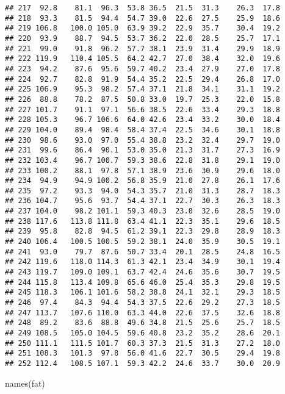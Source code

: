 \documentclass[
]{book}
\newenvironment{Shaded}{\begin{snugshade}}{\end{snugshade}}
\newcommand{\FunctionTok}[1]{\textcolor[rgb]{0.00,0.00,0.00}{#1}}
\newcommand{\NormalTok}[1]{#1}
\theoremstyle{definition}
\theoremstyle{definition}
\theoremstyle{definition}
\theoremstyle{definition}
\theoremstyle{remark}
\begin{document}
\begin{verbatim}
## 217  92.8    81.1  96.3  53.8 36.5  21.5  31.3    26.3  17.8
## 218  93.3    81.5  94.4  54.7 39.0  22.6  27.5    25.9  18.6
## 219 106.8   100.0 105.0  63.9 39.2  22.9  35.7    30.4  19.2
## 220  93.9    88.7  94.5  53.7 36.2  22.0  28.5    25.7  17.1
## 221  99.0    91.8  96.2  57.7 38.1  23.9  31.4    29.9  18.9
## 222 119.9   110.4 105.5  64.2 42.7  27.0  38.4    32.0  19.6
## 223  94.2    87.6  95.6  59.7 40.2  23.4  27.9    27.0  17.8
## 224  92.7    82.8  91.9  54.4 35.2  22.5  29.4    26.8  17.0
## 225 106.9    95.3  98.2  57.4 37.1  21.8  34.1    31.1  19.2
## 226  88.8    78.2  87.5  50.8 33.0  19.7  25.3    22.0  15.8
## 227 101.7    91.1  97.1  56.6 38.5  22.6  33.4    29.3  18.8
## 228 105.3    96.7 106.6  64.0 42.6  23.4  33.2    30.0  18.4
## 229 104.0    89.4  98.4  58.4 37.4  22.5  34.6    30.1  18.8
## 230  98.6    93.0  97.0  55.4 38.8  23.2  32.4    29.7  19.0
## 231  99.6    86.4  90.1  53.0 35.0  21.3  31.7    27.3  16.9
## 232 103.4    96.7 100.7  59.3 38.6  22.8  31.8    29.1  19.0
## 233 100.2    88.1  97.8  57.1 38.9  23.6  30.9    29.6  18.0
## 234  94.9    94.9 100.2  56.8 35.9  21.0  27.8    26.1  17.6
## 235  97.2    93.3  94.0  54.3 35.7  21.0  31.3    28.7  18.3
## 236 104.7    95.6  93.7  54.4 37.1  22.7  30.3    26.3  18.3
## 237 104.0    98.2 101.1  59.3 40.3  23.0  32.6    28.5  19.0
## 238 117.6   113.8 111.8  63.4 41.1  22.3  35.1    29.6  18.5
## 239  95.8    82.8  94.5  61.2 39.1  22.3  29.8    28.9  18.3
## 240 106.4   100.5 100.5  59.2 38.1  24.0  35.9    30.5  19.1
## 241  93.0    79.7  87.6  50.7 33.4  20.1  28.5    24.8  16.5
## 242 119.6   118.0 114.3  61.3 42.1  23.4  34.9    30.1  19.4
## 243 119.7   109.0 109.1  63.7 42.4  24.6  35.6    30.7  19.5
## 244 115.8   113.4 109.8  65.6 46.0  25.4  35.3    29.8  19.5
## 245 118.3   106.1 101.6  58.2 38.8  24.1  32.1    29.3  18.5
## 246  97.4    84.3  94.4  54.3 37.5  22.6  29.2    27.3  18.5
## 247 113.7   107.6 110.0  63.3 44.0  22.6  37.5    32.6  18.8
## 248  89.2    83.6  88.8  49.6 34.8  21.5  25.6    25.7  18.5
## 249 108.5   105.0 104.5  59.6 40.8  23.2  35.2    28.6  20.1
## 250 111.1   111.5 101.7  60.3 37.3  21.5  31.3    27.2  18.0
## 251 108.3   101.3  97.8  56.0 41.6  22.7  30.5    29.4  19.8
## 252 112.4   108.5 107.1  59.3 42.2  24.6  33.7    30.0  20.9
\end{verbatim}

\begin{Shaded}
\begin{Highlighting}[]
\FunctionTok{names}\NormalTok{(fat)}
\end{Highlighting}
\end{Shaded}
\end{document}
